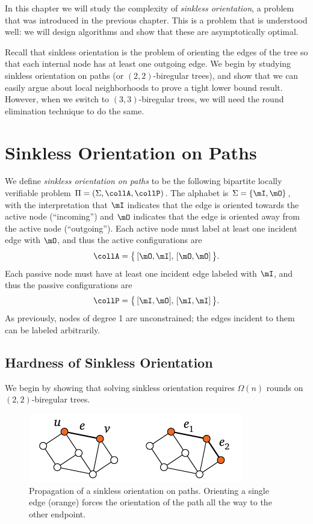 

\noindent
In this chapter we will study the complexity of \emph{sinkless orientation}, a problem that was introduced in the previous chapter. This is a problem that is understood well: we will design algorithms and show that these are asymptotically optimal.

Recall that sinkless orientation is the problem of orienting the edges of the tree so that each internal node has at least one outgoing edge. We begin by studying sinkless orientation on paths (or $(2,2)$-biregular trees), and show that we can easily argue about local neighborhoods to prove a tight lower bound result. However, when we switch to $(3,3)$-biregular trees, we will need the round elimination technique to do the same.

\section{Sinkless Orientation on Paths} \label{sec:so-paths}

We define \emph{sinkless orientation on paths} to be the following bipartite locally verifiable problem $\Pi = (\Sigma, \collA, \collP)$. The alphabet is $\Sigma = \{ \mI, \mO \}$, with the interpretation that $\mI$ indicates that the edge is oriented towards the active node (``incoming'') and $\mO$ indicates that the edge is oriented away from the active node (``outgoing''). Each active node must label at least one incident edge with $\mO$, and thus the active configurations are
\[
	\collA = \bigl\{ \, [\mO, \mI],\, [\mO, \mO] \, \bigr\}. 
\]
Each passive node must have at least one incident edge labeled with $\mI$, and thus the passive configurations are
\[
	\collP = \bigl\{ \, [\mI, \mO],\,[\mI, \mI] \, \bigr\}. 
\]
As previously, nodes of degree 1 are unconstrained; the edges incident to them can be labeled arbitrarily.

\subsection{Hardness of Sinkless Orientation}\label{ssec:so-hard-paths}

We begin by showing that solving sinkless orientation requires $\Omega(n)$ rounds on $(2,2)$-biregular trees.

\begin{figure}
	\centering
	\includegraphics[page=\PSOPathIntuition,scale=0.4]{figs.pdf}
	\caption{Propagation of a sinkless orientation on paths. Orienting a single edge (orange) forces the orientation of the path all the way to the other endpoint.} \label{fig:so-intuition}
\end{figure}

